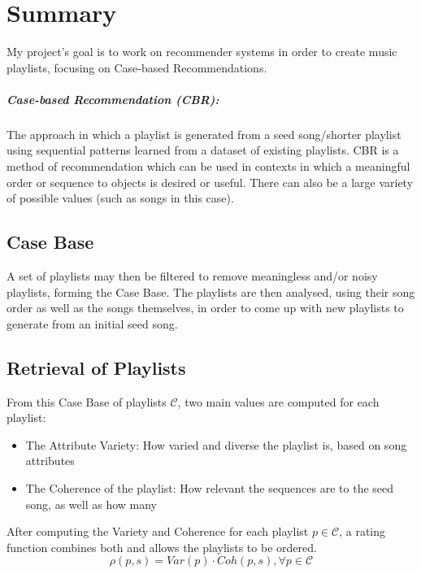 \documentclass[a4paper, 12pt]{report}
\begin{document}
\chapter{Summary}
My project's goal is to work on recommender systems in order to create music playlists, focusing on Case-based Recommendations.

\paragraph{Case-based Recommendation (CBR):}
The approach in which a playlist is generated from a seed song/shorter playlist using sequential patterns 
learned from a dataset of existing playlists.
CBR is a method of recommendation which can be used in contexts in which a meaningful order or sequence to objects is desired or useful.
There can also be a large variety of possible values (such as songs in this case).

\section{Case Base}
A set of playlists may then be filtered to remove meaningless and/or noisy playlists, forming the Case Base.
The playlists are then analysed, using their song order as well as the songs themselves, in order to 
come up with new playlists to generate from an initial seed song.

\section{Retrieval of Playlists}
From this Case Base of playlists \(\mathcal{C}\), two main values are computed for each playlist:
\begin{itemize}
    \item The Attribute Variety: How varied and diverse the playlist is, based on song attributes
    \item The Coherence of the playlist: How relevant the sequences are to the seed song, as well as how many
\end{itemize}

After computing the Variety and Coherence for each playlist \(p\in\mathcal{C}\), a rating function combines both and allows the playlists to be ordered.
\[\rho(p, s) = Var(p) \cdot Coh(p, s), \forall p \in \mathcal{C}\]
\end{document}
